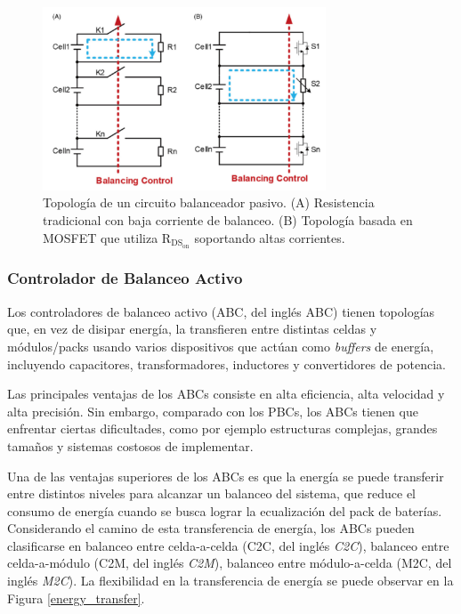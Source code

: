 \documentclass[10pt,a4paper]{article}
\newcounter{subsubsubsection}[subsubsection]
\begin{document}
\begin{figure}[h!]
    \begin{center}
        \includegraphics[width=0.75\textwidth]{passive_eq_top.png}
        \caption{Topolog\'ia de un circuito balanceador pasivo. (A) Resistencia
        tradicional con baja corriente de balanceo. (B) Topolog\'ia basada en
        MOSFET que utiliza $\mathrm{R_{DS_{on}}}$ soportando altas corrientes.}
        \label{passive_eq_top}
    \end{center}
\end{figure}

\subsubsection{Controlador de Balanceo Activo}

Los controladores de balanceo activo (\acrshort{ABC}, del ingl\'es \acrlong{ABC})
tienen topolog\'ias que, en vez de disipar energ\'ia, la transfieren entre
distintas celdas y m\'odulos/packs usando varios dispositivos que act\'uan como
\emph{buffers} de energ\'ia, incluyendo capacitores, transformadores, inductores
y convertidores de potencia.

Las principales ventajas de los \acrshort{ABC}s consiste en alta eficiencia,
alta velocidad y alta precisi\'on. Sin embargo, comparado con los 
\acrshort{PBC}s, los \acrshort{ABC}s tienen que enfrentar ciertas dificultades, 
como por ejemplo estructuras complejas, grandes tamaños y sistemas costosos de 
implementar.


Una de las ventajas superiores de los \acrshort{ABC}s es que la energ\'ia se
puede transferir entre distintos niveles para alcanzar un balanceo del sistema,
que reduce el consumo de energ\'ia cuando se busca lograr la ecualizaci\'on del
pack de bater\'ias. Considerando el camino de esta transferencia de energ\'ia,
los \acrshort{ABC}s pueden clasificarse en balanceo entre celda-a-celda
(\acrshort{C2C}, del ingl\'es \emph{\acrlong{C2C}}), balanceo entre
celda-a-m\'odulo (\acrshort{C2M}, del ingl\'es \emph{\acrlong{C2M}}), balanceo
entre m\'odulo-a-celda (\acrshort{M2C}, del ingl\'es \emph{\acrlong{M2C}}). La
flexibilidad en la transferencia de energ\'ia se puede observar en la Figura
\ref{energy_transfer}.
\end{document}
